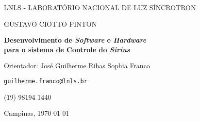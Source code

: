 \newcommand{\namesigdate}[2][8cm]{%
  \begin{tabular}{@{}p{#1}}
    \\[1\normalbaselineskip] \hrule \\[0pt]
    {\small \textit{#2}} \\[1\normalbaselineskip]
  \end{tabular}
}

\begin{center}


\vspace*{12pt}

LNLS - LABORATÓRIO NACIONAL DE LUZ SÍNCROTRON

\vspace*{.25\textheight}

{\Large GUSTAVO CIOTTO PINTON}

\vspace*{72pt}
\textbf{\Large Desenvolvimento de \textit{Software} e \textit{Hardware} \\ para
o sistema de Controle do \textit{Sirius}} \\ \vspace{12pt}

\vspace{12pt}

Orientador: José Guilherme Ribas Sophia Franco

\texttt{guilherme.franco@lnls.br}

(19) 98194-1440



\vspace{240pt}
 
Campinas, \today

\end{center}

\newpage 
